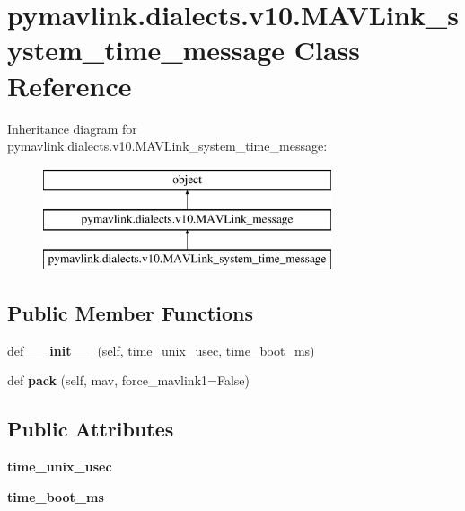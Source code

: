 \hypertarget{classpymavlink_1_1dialects_1_1v10_1_1MAVLink__system__time__message}{}\section{pymavlink.\+dialects.\+v10.\+M\+A\+V\+Link\+\_\+system\+\_\+time\+\_\+message Class Reference}
\label{classpymavlink_1_1dialects_1_1v10_1_1MAVLink__system__time__message}
Inheritance diagram for pymavlink.\+dialects.\+v10.\+M\+A\+V\+Link\+\_\+system\+\_\+time\+\_\+message\+:\begin{figure}[H]
\begin{center}
\leavevmode
\includegraphics[height=3.000000cm]{classpymavlink_1_1dialects_1_1v10_1_1MAVLink__system__time__message}
\end{center}
\end{figure}
\subsection*{Public Member Functions}
\begin{DoxyCompactItemize}
\item 
\mbox{\label{classpymavlink_1_1dialects_1_1v10_1_1MAVLink__system__time__message_a168695aa1168b3f4249491aa27c21294}} 
def {\bfseries \+\_\+\+\_\+init\+\_\+\+\_\+} (self, time\+\_\+unix\+\_\+usec, time\+\_\+boot\+\_\+ms)
\item 
\mbox{\label{classpymavlink_1_1dialects_1_1v10_1_1MAVLink__system__time__message_a45ced14f703b98c592c2cbb3cc0a198a}} 
def {\bfseries pack} (self, mav, force\+\_\+mavlink1=False)
\end{DoxyCompactItemize}
\subsection*{Public Attributes}
\begin{DoxyCompactItemize}
\item 
\mbox{\label{classpymavlink_1_1dialects_1_1v10_1_1MAVLink__system__time__message_a472613c4b3230dd0545715147b307bf3}} 
{\bfseries time\+\_\+unix\+\_\+usec}
\item 
\mbox{\label{classpymavlink_1_1dialects_1_1v10_1_1MAVLink__system__time__message_a50c24d838b1a0e76ea0a199e0660bc34}} 
{\bfseries time\+\_\+boot\+\_\+ms}
\end{DoxyCompactItemize}
